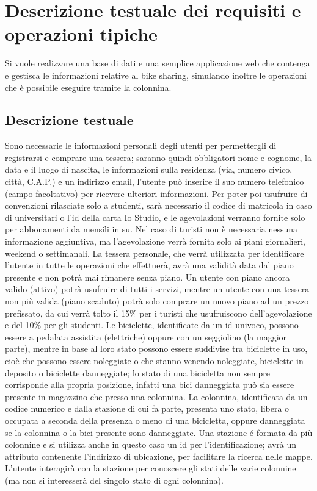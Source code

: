 \documentclass[a4paper,twoside]{article}
\begin{document}
\section{Descrizione testuale dei requisiti e operazioni tipiche}
Si vuole realizzare una base di dati e una semplice applicazione web che contenga e gestisca le informazioni relative al bike sharing, simulando inoltre le operazioni che è possibile eseguire tramite la colonnina.

\subsection{Descrizione testuale}
Sono necessarie le informazioni personali degli utenti per permettergli di registrarsi e comprare una tessera; saranno quindi obbligatori nome e cognome, la data e il luogo di nascita, le informazioni sulla residenza (via, numero civico, città, C.A.P.) e un indirizzo email, l'utente può inserire il suo numero telefonico (campo facoltativo) per ricevere ulteriori informazioni.\newline
Per poter poi usufruire di convenzioni rilasciate solo a studenti, sarà necessario il codice di matricola in caso di universitari o l'id della carta Io Studio, e le agevolazioni verranno fornite solo per abbonamenti da mensili in su.\newline
Nel caso di turisti non è necessaria nessuna informazione aggiuntiva, ma l'agevolazione verrà fornita solo ai piani giornalieri, weekend o settimanali.\newline
La tessera personale, che verrà utilizzata per identificare l'utente in tutte le operazioni che effettuerà, avrà una validità data dal piano presente e non potrà mai rimanere senza piano. Un utente con piano ancora valido (attivo) potrà usufruire di tutti i servizi, mentre un utente con una tessera non più valida (piano scaduto) potrà solo comprare un nuovo piano ad un prezzo prefissato, da cui verrà tolto il 15\% per i turisti che usufruiscono dell'agevolazione e del 10\% per gli studenti.\newline
Le biciclette, identificate da un id univoco, possono essere a pedalata assistita (elettriche) oppure con un seggiolino (la maggior parte), mentre in base al loro stato possono essere suddivise tra biciclette in uso, cioè che possono essere noleggiate o che stanno venendo noleggiate, biciclette in deposito o biciclette danneggiate; lo stato di una bicicletta non sempre corrisponde alla propria posizione, infatti una bici danneggiata può sia essere presente in magazzino che presso una colonnina.\newline
La  colonnina, identificata da un codice numerico e dalla stazione di cui fa parte, presenta uno stato,  libera o occupata a seconda della presenza o meno di una bicicletta, oppure danneggiata se la colonnina o la bici presente sono danneggiate.\newline
Una stazione é formata da più colonnine e si utilizza anche in questo caso un id per l'identificazione; avrà un attributo contenente l'indirizzo di ubicazione, per facilitare la ricerca nelle mappe. L'utente interagirà con la stazione per conoscere gli stati delle varie colonnine (ma non si interesserà del singolo stato di ogni colonnina).
\end{document}
